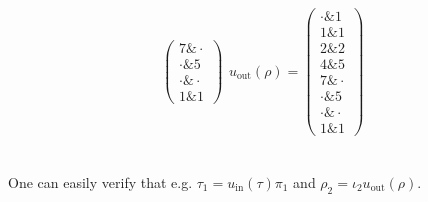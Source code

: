 \begin{example}
\begin{minipage}[t]{.5\textwidth}
\begin{align*}
\begin{array}{rr}
\begin{pmatrix}
7 \ampersand \cdot \\
\cdot \ampersand 5 \\
\cdot \ampersand \cdot \\
1 \ampersand 1
\end{pmatrix}
\end{array}
u_{\text{out}}(\rho) = \begin{pmatrix}
\cdot \ampersand 1 \\
1 \ampersand 1 \\
2 \ampersand 2 \\
4 \ampersand 5 \\
7 \ampersand \cdot \\
\cdot \ampersand 5 \\
\cdot \ampersand \cdot \\
1 \ampersand 1
\end{pmatrix}
\end{align*}
\end{minipage}\\

\noindent One can easily verify that e.g. $\tau_{1} = u_{\mathrm{in}}(\tau) \pi_{1}$ and $\rho_{2} = \iota_{2} u_{\mathrm{out}}(\rho)$.
\end{example}
